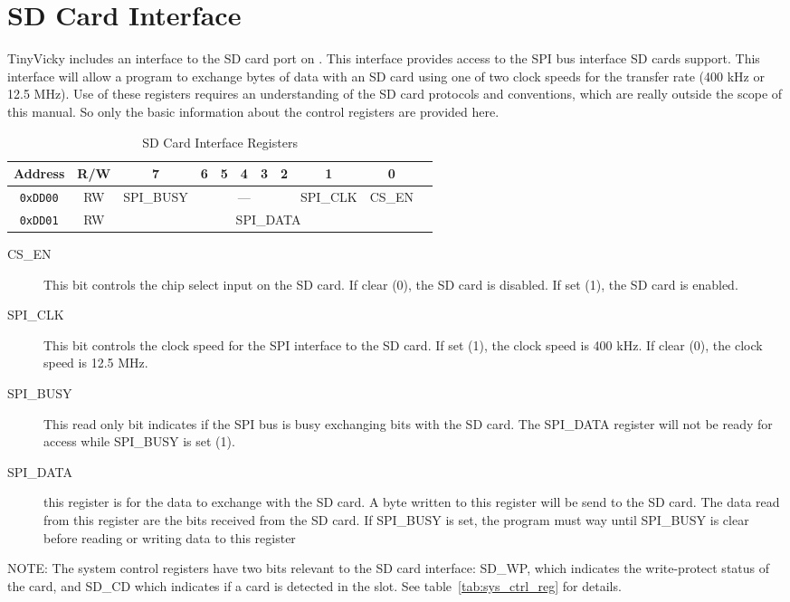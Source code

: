 \chapter{SD Card Interface}

TinyVicky includes an interface to the SD card port on \jr. This interface provides access to the SPI bus interface SD cards support. This interface will allow a program to exchange bytes of data with an SD card using one of two clock speeds for the transfer rate (400 kHz or 12.5 MHz).  Use of these registers requires an understanding of the SD card protocols and conventions, which are really outside the scope of this manual. So only the basic information about the control registers are provided here.

\begin{table}[ht]
    \begin{center}
        \begin{tabular}{|c|c|c|c|c|c|c|c|c|c|c|} \hline
            Address & R/W & 7 & 6 & 5 & 4 & 3 & 2 & 1 & 0 \\\hline\hline
            \verb+0xDD00+ & RW & SPI\_BUSY & \multicolumn{5}{|c|}{---} & SPI\_CLK & CS\_EN \\\hline
            \verb+0xDD01+ & RW & \multicolumn{8}{|c|}{SPI\_DATA} \\\hline
        \end{tabular}
    \end{center}
    \caption{SD Card Interface Registers}
\end{table}

\begin{description}
    \item[CS\_EN] This bit controls the chip select input on the SD card. If clear (0), the SD card is disabled. If set (1), the SD card is enabled.
    \item[SPI\_CLK] This bit controls the clock speed for the SPI interface to the SD card. If set (1), the clock speed is 400 kHz. If clear (0), the clock speed is 12.5 MHz.
    \item[SPI\_BUSY] This read only bit indicates if the SPI bus is busy exchanging bits with the SD card. The SPI\_DATA register will not be ready for access while SPI\_BUSY is set (1).
    \item[SPI\_DATA] this register is for the data to exchange with the SD card. A byte written to this register will be send to the SD card. The data read from this register are the bits received from the SD card. If SPI\_BUSY is set, the program must way until SPI\_BUSY is clear before reading or writing data to this register
\end{description}

NOTE: The system control registers have two bits relevant to the SD card interface: SD\_WP, which indicates the write-protect status of the card, and SD\_CD which indicates if a card is detected in the slot. See table~\ref{tab:sys_ctrl_reg} for details.